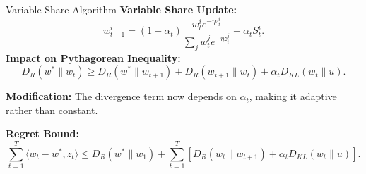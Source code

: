 \documentclass[handout]{beamer}
\begin{document}
\begin{small}
\begin{frame}{Variable Share Algorithm}
\textbf{Variable Share Update:}  
\[
w_{t+1}^i = (1 - \alpha_t) \frac{w_t^i e^{-\eta z_t^i}}{\sum_j w_t^j e^{-\eta z_t^j}} + \alpha_t S_t^i.
\]
\textbf{Impact on Pythagorean Inequality:}
\[
D_R(w^* \| w_t) \geq D_R(w^* \| w_{t+1}) + D_R(w_{t+1} \| w_t) + \alpha_t D_{KL}(w_t \| u).
\]

\textbf{Modification:}  
\textcolor{mathcolor}{The divergence term now depends on \( \alpha_t \), making it adaptive rather than constant.}

\textbf{Regret Bound:}  
\[
\sum_{t=1}^{T} \langle w_t - w^*, z_t \rangle \leq D_R(w^* \| w_1) + \sum_{t=1}^{T} \left[ D_R(w_t \| w_{t+1}) + \alpha_t D_{KL}(w_t \| u) \right].
\]
\end{frame}


\end{small}
\end{document}
